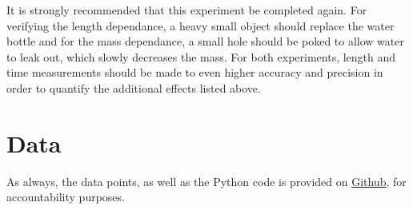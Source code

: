 \documentclass[%
 reprint,
 amsmath,amssymb
 aps,
]{revtex4-2}
\begin{document}
It is strongly recommended that this experiment be completed again. For verifying the length dependance, a heavy small object should replace the water bottle and for the mass dependance, a small hole should be poked to allow water to leak out, which slowly decreases the mass. For both experiments, length and time measurements should be made to even higher accuracy and precision in order to quantify the additional effects listed above.

\appendix
\section{Data}
As always, the data points, as well as the Python code is provided on \href{https://github.com/QiLinXue/pendulum-labs/}{Github}, for accountability purposes.
\end{document}
